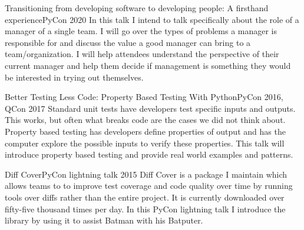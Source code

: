 
\begin{talks}

	\talk
	{Transitioning from developing software to developing people: A firsthand experience}{PyCon 2020}
	{In this talk I intend to talk specifically about the role of a manager of a single team. I will go over the types of problems a manager is responsible for and discuss the value a good manager can bring to a team/organization. I will help attendees understand the perspective of their current manager and help them decide if management is something they would be interested in trying out themselves.}

	\talk
	{Better Testing Less Code: Property Based Testing With Python}{PyCon 2016, QCon 2017}
	{Standard unit tests have developers test specific inputs and outputs. This works, but often what breaks code are the cases we did not think about. Property based testing has developers define properties of output and has the computer explore the possible inputs to verify these properties. This talk will introduce property based testing and provide real world examples and patterns.}

	\talk
	{Diff Cover}{PyCon lightning talk 2015}
	{Diff Cover is a package I maintain which allows teams to to improve test coverage and code quality over time by running tools over diffs rather than the entire project. It is currently downloaded over fifty-five thousand times per day. In this PyCon lightning talk I introduce the library by using it to assist Batman with his Batputer.}

\end{talks}